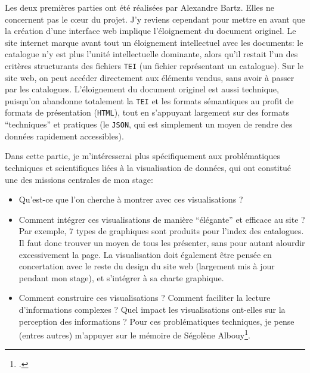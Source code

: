 \documentclass[a4paper, 12pt, twoside]{book}
\newcommand{\html}{\texttt{HTML}}
\newcommand{\json}{\texttt{JSON}}
\newcommand{\tei}{\texttt{TEI}}
\begin{document}
Les deux premières parties ont été réalisées par Alexandre Bartz. Elles ne concernent pas le cœur du projet. J'y reviens cependant pour mettre en avant que la création d'une interface web implique l'éloignement du document originel. Le site internet marque avant tout un éloignement intellectuel avec les documents: le catalogue n'y est plus l'unité intellectuelle dominante, alors qu'il restait l'un des critères structurants des fichiers \tei{} (un fichier représentant un catalogue). Sur le site web, on peut accéder directement aux éléments vendus, sans avoir à passer par les catalogues. L'éloignement du document originel est aussi technique, puisqu'on abandonne totalement la \tei{} et les formats sémantiques au profit de formats de présentation (\html{}), tout en s'appuyant largement sur des formats \enquote{techniques} et pratiques (le \json, qui est simplement un moyen de rendre des données rapidement accessibles).

Dans cette partie, je m'intéresserai plus spécifiquement aux problématiques techniques et scientifiques liées à la visualisation de données, qui ont constitué une des missions centrales de mon stage:
\begin{itemize}
 \item Qu'est-ce que l'on cherche à montrer avec ces visualisations ?
 	\item Comment intégrer ces visualisations de manière \enquote{élégante} et efficace au site ? Par exemple, 7 types de graphiques sont produits pour l'index des catalogues. Il faut donc trouver un moyen de tous les présenter, sans pour autant alourdir excessivement la page. La visualisation doit également être pensée en concertation avec le reste du design du site web (largement mis à jour pendant mon stage), et s'intégrer à sa charte graphique.
 \item Comment construire ces visualisations ? Comment faciliter la lecture d'informations complexes ? Quel impact les visualisations ont-elles sur la perception des informations ? Pour ces problématiques techniques, je pense (entres autres) m'appuyer sur le mémoire de Ségolène Albouy\footcite{albouy_mediation_2019}.
\end{itemize}
\end{document}
